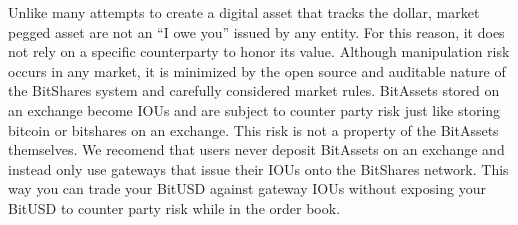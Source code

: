 Unlike many attempts to create a digital asset that tracks the dollar, market
pegged asset are not an ``I owe you'' issued by any entity. For this reason, it
does not rely on a specific counterparty to honor its value. Although
manipulation risk occurs in any market, it is minimized by the open source and
auditable nature of the BitShares system and carefully considered market rules.
BitAssets stored on an exchange become IOUs and are subject to counter party
risk just like storing bitcoin or bitshares on an exchange. This risk is not a
property of the BitAssets themselves. We recomend that users never deposit
BitAssets on an exchange and instead only use gateways that issue their IOUs
onto the BitShares network. This way you can trade your BitUSD against gateway
IOUs without exposing your BitUSD to counter party risk while in the order
book.
